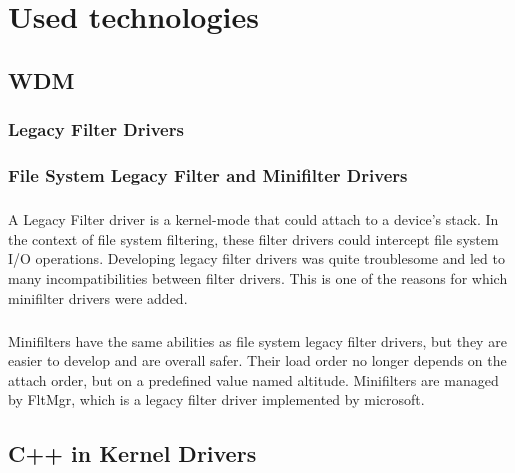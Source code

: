 \chapter{Used technologies}
    \section{WDM}

        \subsection{Legacy Filter Drivers}

        \subsection{File System Legacy Filter and Minifilter Drivers}
            \paragraph{}
            A Legacy Filter driver is a kernel-mode that could attach to a device's stack. In the context of file system filtering, these
            filter drivers could intercept file system I/O operations. Developing legacy filter drivers was quite troublesome and led to 
            many incompatibilities between filter drivers. This is one of the reasons for which minifilter drivers were added.
            \paragraph{}
            Minifilters have the same abilities as file system legacy filter drivers, but they are easier to develop and are overall safer. Their
            load order no longer depends on the attach order, but on a predefined value named altitude. Minifilters are managed by FltMgr, which is
            a legacy filter driver implemented by microsoft.
    \section{C++ in Kernel Drivers}
    
